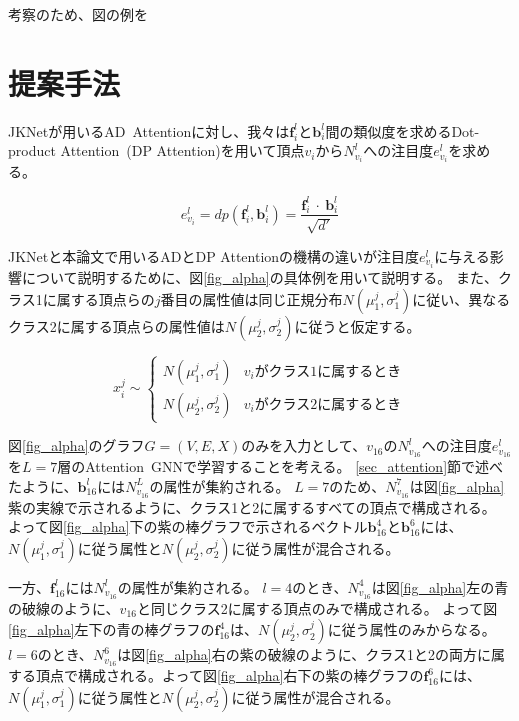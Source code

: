 \documentclass[a4j,twocolumn]{jsarticle}
\begin{document}
考察のため、図の例を

\section{提案手法}
\label{sec_proposal}

\vspace{-2mm}
JKNetが用いるAD~Attentionに対し、我々は$\bm{f}_i^l$と$\bm{b}_i^l$間の類似度を求めるDot-product Attention~(DP Attention)\cite{Vaswani}を用いて頂点$v_i$から$N_{v_i}^l$への注目度$e_{v_i}^l$を求める。

\vspace{-2mm}
\begin{equation}
  e_{v_i}^l = dp(\bm{f}_i^l, \bm{b}_i^l) = \frac{\bm{f}_i^l~ \cdot ~\bm{b}_i^l}{\sqrt{d'}} \label{eq_DP_Attention}
\end{equation}
\vspace{-4mm}


JKNetと本論文で用いるADとDP Attentionの機構の違いが注目度$e_{v_i}^l$に与える影響について説明するために、図\ref{fig_alpha}の具体例を用いて説明する。
また、クラス1に属する頂点らの$j$番目の属性値は同じ正規分布$N(\mu_1^j, \sigma_1^j)$に従い、異なるクラス2に属する頂点らの属性値は$N(\mu_2^j, \sigma_2^j)$に従うと仮定する。

\vspace{-2mm}
\begin{equation}
  x_i^j \sim
      \begin{cases}
          N(\mu_1^j, \sigma_1^j)    &   \text{$v_i$がクラス1に属するとき} \nonumber \\
          N(\mu_2^j, \sigma_2^j)    &   \text{$v_i$がクラス2に属するとき} \nonumber
      \end{cases}
\end{equation}

\vspace{-1mm}
\noindent
図\ref{fig_alpha}のグラフ$G=(V,E,X)$のみを入力として、$v_{16}$の$N_{v_{16}}^l$への注目度$e_{v_{16}}^l$を$L=7$層のAttention~GNNで学習することを考える。
\ref{sec_attention}節で述べたように、$\bm{b}_{16}^l$には$N_{v_{16}}^L$の属性が集約される。
$L=7$のため、$N_{v_{16}}^7$は図\ref{fig_alpha}紫の実線で示されるように、クラス1と2に属するすべての頂点で構成される。
よって図\ref{fig_alpha}下の紫の棒グラフで示されるベクトル$\bm{b}_{16}^4$と$\bm{b}_{16}^6$には、$N(\mu_1^j, \sigma_1^j)$に従う属性と$N(\mu_2^j, \sigma_2^j)$に従う属性が混合される。

一方、$\bm{f}_{16}^l$には$N_{v_{16}}^l$の属性が集約される。
$l=4$のとき、$N_{v_{16}}^4$は図\ref{fig_alpha}左の青の破線のように、$v_{16}$と同じクラス2に属する頂点のみで構成される。
よって図\ref{fig_alpha}左下の青の棒グラフの$\bm{f}_{16}^4$は、$N(\mu_2^j, \sigma_2^j)$に従う属性のみからなる。
$l=6$のとき、$N_{v_{16}}^6$は図\ref{fig_alpha}右の紫の破線のように、クラス1と2の両方に属する頂点で構成される。よって図\ref{fig_alpha}右下の紫の棒グラフの$\bm{f}_{16}^6$には、$N(\mu_1^j, \sigma_1^j)$に従う属性と$N(\mu_2^j, \sigma_2^j)$に従う属性が混合される。
\end{document}
